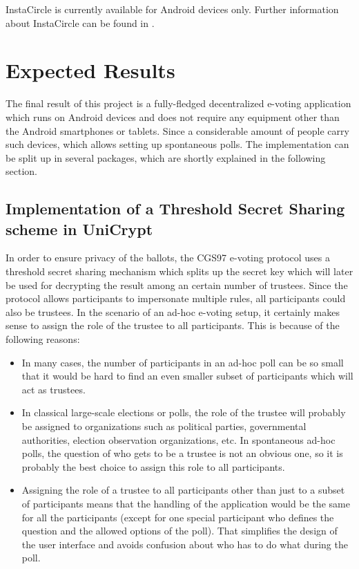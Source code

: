 \documentclass[numbers=noenddot, abstract=on, a4paper, headsepline,
footsepline, oneside, draft=off]{scrreprt}
\begin{document}
InstaCircle is currently available for Android devices only. Further information
about InstaCircle can be found in \cite{ritter13a}.

\chapter{Expected Results}
\label{cha:expectedresults}
The final result of this project is a fully-fledged decentralized e-voting
application which runs on Android devices and does not require any equipment
other than the Android smartphones or tablets. Since a considerable amount of
people carry such devices, which allows setting up spontaneous polls. The
implementation can be split up in several packages, which are shortly explained
in the following section.

\section{Implementation of a Threshold Secret Sharing scheme in UniCrypt}
\label{sec:thresholdsecretsharing}
In order to ensure privacy of the ballots, the CGS97 \cite{CGS97} e-voting
protocol uses a threshold secret sharing mechanism which splits up the secret
key which will later be used for decrypting the result among an certain number
of trustees. Since the protocol allows participants to impersonate multiple
rules, all participants could also be trustees. In the scenario of an ad-hoc
e-voting setup, it certainly makes sense to assign the role of the trustee to
all participants. This is because of the following reasons:
\begin{itemize}
  \item In many cases, the number of participants in an ad-hoc poll can be so
  small that it would be hard to find an even smaller subset of participants
  which will act as trustees.
  \item In classical large-scale elections or polls, the role of the trustee
  will probably be assigned to organizations such as political parties,
  governmental authorities, election observation organizations, etc. In
  spontaneous ad-hoc polls, the question of who gets to be a trustee is not an
  obvious one, so it is probably the best choice to assign this role to all
  participants.
  \item Assigning the role of a trustee to all participants other than just to a
  subset of participants means that the handling of the application would be the
  same for all the participants (except for one special participant who defines
  the question and the allowed options of the poll). That simplifies the design
  of the user interface and avoids confusion about who has to do what during the
  poll.
\end{itemize}
\end{document}
